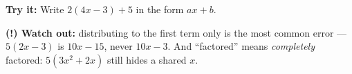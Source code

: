 \documentclass[12pt]{article}
\begin{document}
\begin{tryitbox}
\textbf{Try it:} Write $2(4x - 3) + 5$ in the form $ax + b$.\\[2pt]
\end{tryitbox}

\begin{watchoutbox}
\textbf{(!) Watch out:} distributing to the first term only is the most common
error --- $5(2x - 3)$ is $10x - 15$, never $10x - 3$. And ``factored'' means
\emph{completely} factored: $5(3x^2 + 2x)$ still hides a shared $x$.
\end{watchoutbox}
\end{document}
